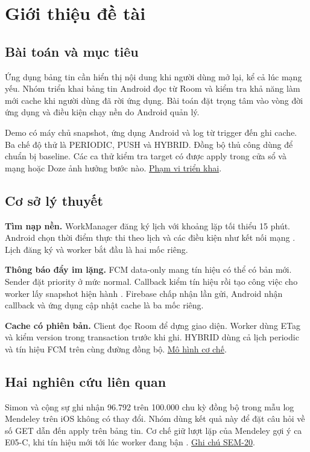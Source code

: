 \documentclass[12pt,a4paper]{report}
\newcommand{\repo}{https://github.com/ThanhTris/Seminar-IE307/blob/db8dc5f}
\newcommand{\source}[2]{\href{\repo/#1}{#2}}
\begin{document}

\fontsize{13}{17}\selectfont

\chapter{Giới thiệu đề tài}
\section{Bài toán và mục tiêu}
Ứng dụng bảng tin cần hiển thị nội dung khi người dùng mở lại, kể cả lúc mạng yếu. Nhóm triển khai bảng tin Android đọc từ Room và kiểm tra khả năng làm mới cache khi người dùng đã rời ứng dụng. Bài toán đặt trọng tâm vào vòng đời ứng dụng và điều kiện chạy nền do Android quản lý.

Demo có máy chủ snapshot, ứng dụng Android và log từ trigger đến ghi cache. Ba chế độ thử là PERIODIC, PUSH và HYBRID. Đồng bộ thủ công dùng để chuẩn bị baseline. Các ca thử kiểm tra target có được apply trong cửa sổ và mạng hoặc Doze ảnh hưởng bước nào. \source{docs/SCOPE.md}{Phạm vi triển khai}.

\section{Cơ sở lý thuyết}
\textbf{Tìm nạp nền.} WorkManager đăng ký lịch với khoảng lặp tối thiểu 15 phút. Android chọn thời điểm thực thi theo lịch và các điều kiện như kết nối mạng \citep{AndroidDefineWork,AndroidDozeStandby}. Lịch đăng ký và worker bắt đầu là hai mốc riêng.

\textbf{Thông báo đẩy im lặng.} FCM data-only mang tín hiệu có thể có bản mới. Sender đặt priority ở mức normal. Callback kiểm tín hiệu rồi tạo công việc cho worker lấy snapshot hiện hành \citep{FirebaseReceiveMessages,FirebaseAndroidPriority}. Firebase chấp nhận lần gửi, Android nhận callback và ứng dụng cập nhật cache là ba mốc riêng.

\textbf{Cache có phiên bản.} Client đọc Room để dựng giao diện. Worker dùng ETag và kiểm version trong transaction trước khi ghi. HYBRID dùng cả lịch periodic và tín hiệu FCM trên cùng đường đồng bộ. \source{docs/MECHANISMS.md}{Mô hình cơ chế}.

\section{Hai nghiên cứu liên quan}
Simon và cộng sự ghi nhận 96.792 trên 100.000 chu kỳ đồng bộ trong mẫu log Mendeley trên iOS không có thay đổi. Nhóm dùng kết quả này để đặt câu hỏi về số GET dẫn đến apply trên bảng tin. Cơ chế giữ lượt lặp của Mendeley gợi ý ca E05-C, khi tín hiệu mới tới lúc worker đang bận \citep{Simon2017DiffsyncEnergy}. \source{research/notes/PAPER_1.md}{Ghi chú SEM-20}.
\end{document}

